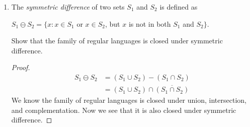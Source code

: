\documentclass[]{article}
\theoremstyle{definition}
\begin{document}
\begin{enumerate}
    \begin{proof}
        Induction on $n$ to show that if $L_1$, $L_2$, ..., $L_n$ are regular,
        $L_U = \cup_{i=\{1, 2, ...n\}} L_i$ is also regular. \par
        \underline{Base case}: If $n = 1$, the expanded right side is $L_1$ and it is regular.
        So the argument holds when $n = 1$, now we have a base case. \par
        \underline{Inductive step}: Let $k \geq 1$ be an arbitrary natural number.\\
        Let assume the induction hypothesis: the argument holds for all values of $n$ up to
        some $k$. \\
        Then, with $n = n + 1$, $L_U = \displaystyle\bigcup_{i=\{1, 2, .., n+1\}} L_i$
        $= \displaystyle\bigcup_{i=\{1, 2, .., n\}} L_i \cup L_{n+1}$.
        From the latest formula, the left operand of $\cup$ is regular by inductive hypothesis,
        and the right operand is also regular immediately by the argument.
        Since the family of regular languages are closed under union, now we see
        that the argument holds for $n = n + 1$, consequently holds for any arbitrary $n$,
        $n \geq 1$.
    \end{proof}
    
    Showing that the family of regular languages is closed under finite intersection will
    taken easy as above.
    
\item
    The \textit{symmetric difference} of two sets $S_1$ and $S_2$ is defined as
    \begin{center}
        $S_1 \ominus S_2 = \{x: x \in S_1$ or $x \in S_2$, but $x$ is not in both
        $S_1$ and $S_2\}$.
    \end{center}
    Show that the family of regular languages is closed under symmetric difference.
    
    \begin{proof}
        \begin{equation*}
        \begin{split}
            S_1 \ominus S_2 & = (S_1 \cup S_2) - (S_1 \cap S_2) \\
            & = (S_1 \cup S_2) \cap \overline{(S_1 \cap S_2)}
        \end{split}
        \end{equation*}
        We know the family of regular languages is closed under union,
        intersection, and complementation. Now we see that it is also closed
        under symmetric difference.
    \end{proof}
    
\end{enumerate}
\end{document}
